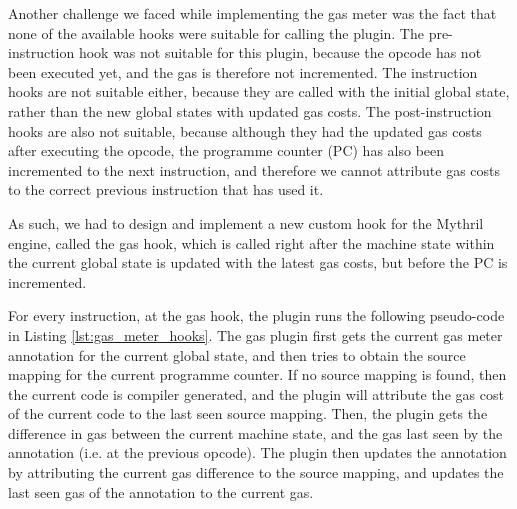 Another challenge we faced while implementing the gas meter 
was the fact that none of the available hooks were suitable 
for calling the plugin. The pre-instruction hook was not suitable
for this plugin, because the opcode has not been executed yet, and the gas is therefore not 
incremented. The instruction hooks are not suitable either, because they are called with the
initial global state, rather than the new global states with updated gas costs. The post-instruction
hooks are also not suitable, because although they had the updated gas costs after executing the
opcode, the programme counter (PC) has also been incremented to the next instruction, and therefore
we cannot attribute gas costs to the correct previous instruction that has used it. 

As such, 
we had to design and implement a new custom hook for the Mythril engine, called the gas hook, 
which is called right after the machine state within the current
global state is updated with the latest gas costs, but before the PC is 
incremented.

For every instruction, at the gas hook, 
the plugin runs the following pseudo-code in Listing \ref{lst:gas_meter_hooks}. 
The gas plugin first gets the current gas meter annotation for the current global state,
and then tries to obtain the source mapping for the current programme counter. If no source
mapping is found, then the current code is compiler generated, and the plugin will
attribute the gas cost of the current code to the last seen source mapping. Then, 
the plugin gets the difference in gas between the current machine state, and the gas last
seen by the annotation (i.e. at the previous opcode). The plugin then updates the annotation
by attributing the current gas difference to the source mapping, and updates the last seen
gas of the annotation to the current gas.

